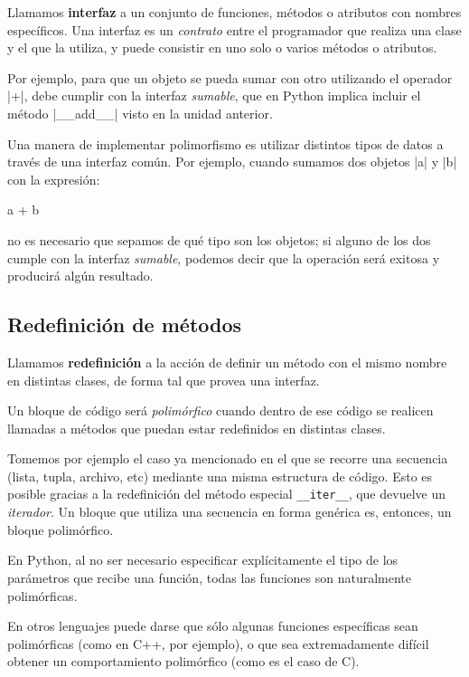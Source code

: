 Llamamos {\bf interfaz} a un conjunto de funciones, métodos o atributos con
nombres específicos.  Una interfaz es un \emph{contrato} entre el
programador que realiza una clase y el que la utiliza, y puede consistir en
uno solo o varios métodos o atributos.

Por ejemplo, para que un objeto se pueda sumar con otro utilizando el
operador |+|, debe cumplir con la interfaz \emph{sumable}, que en Python
implica incluir el método |__add__| visto en la unidad anterior.

Una manera de implementar polimorfismo es utilizar distintos tipos de
datos a través de una interfaz común. Por ejemplo, cuando sumamos dos
objetos |a| y |b| con la expresión:

\begin{codigo-python-sn}
a + b
\end{codigo-python-sn}

\noindent no es necesario que sepamos de qué tipo son los objetos; si
alguno de los dos cumple con la interfaz \emph{sumable}, podemos decir
que la operación será exitosa y producirá algún resultado.

\subsection{Redefinición de métodos}

Llamamos {\bf redefinición} a la acción de definir un método con el mismo
nombre en distintas clases, de forma tal que provea una interfaz.

Un bloque de código será \emph{polimórfico} cuando dentro de ese código se
realicen llamadas a métodos que puedan estar redefinidos en distintas
clases.

Tomemos por ejemplo el caso ya mencionado en el que se recorre una
secuencia (lista, tupla, archivo, etc) mediante una misma estructura de
código.  Esto es posible gracias a la redefinición del método especial
\lstinline!__iter__!, que devuelve un \emph{iterador}.  Un bloque que
utiliza una secuencia en forma genérica es, entonces, un bloque
polimórfico.

\begin{sabias_que}
En Python, al no ser necesario especificar explícitamente el tipo de los
parámetros que recibe una función, todas las funciones son naturalmente
polimórficas.

En otros lenguajes puede darse que sólo algunas funciones específicas sean
polimórficas (como en C++, por ejemplo), o que sea extremadamente difícil
obtener un comportamiento polimórfico (como es el caso de C).
\end{sabias_que}

